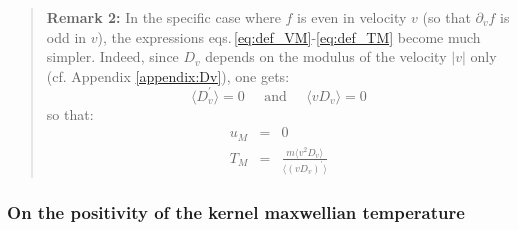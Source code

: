 \documentclass[11pt]{article}
\begin{document}
\begin{footnotesize}
\begin{quotation}
	\textbf{Remark 2:} In the specific case where $f$ is even in velocity $v$ (so that $\partial_v f$ is odd in $v$), the expressions eqs.\,\eqref{eq:def_VM}-\eqref{eq:def_TM} become much simpler. Indeed, since $D_v$ depends on the modulus of the velocity $|v|$ only (cf. Appendix \ref{appendix:Dv}), one gets:
	\begin{equation*}
		\langle D_v^\prime \rangle = 0
		\;\;\;\;\; \textrm{and} \;\;\;\;\; \langle vD_v \rangle = 0
	\end{equation*}
	so that:
	\begin{eqnarray*}
		u_M &=& 0 \\
		T_M &=&
		\frac{m \langle v^2D_v \rangle}{\langle (v D_v)^\prime \rangle}
	\end{eqnarray*}
\end{quotation}
\end{footnotesize}


\subsubsection{On the positivity of the kernel maxwellian temperature}
\end{document}
